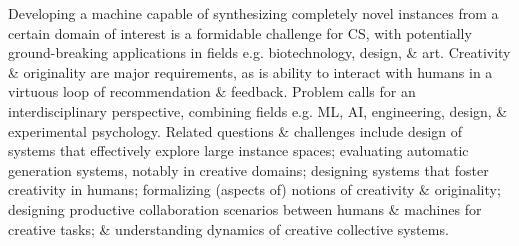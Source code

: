 \documentclass{article}
\begin{document}
Developing a machine capable of synthesizing completely novel instances from a certain domain of interest is a formidable challenge for CS, with potentially ground-breaking applications in fields e.g. biotechnology, design, \& art. Creativity \& originality are major requirements, as is ability to interact with humans in a virtuous loop of recommendation \& feedback. Problem calls for an interdisciplinary perspective, combining fields e.g. ML, AI, engineering, design, \& experimental psychology. Related questions \& challenges include design of systems that effectively explore large instance spaces; evaluating automatic generation systems, notably in creative domains; designing systems that foster creativity in humans; formalizing (aspects of) notions of creativity \& originality; designing productive collaboration scenarios between humans \& machines for creative tasks; \& understanding dynamics of creative collective systems.
\end{document}
